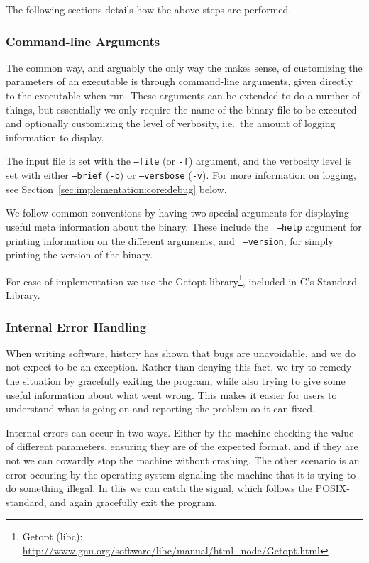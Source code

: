The following sections details how the above steps are performed.

\subsubsection{Command-line Arguments}
The common way, and arguably the only way the makes sense, of customizing the
parameters of an executable is through command-line arguments, given directly to
the executable when run. These arguments can be extended to do a number of
things, but essentially we only require the name of the binary file to be
executed and optionally customizing the level of verbosity, i.e.\ the amount of
logging information to display.

The input file is set with the {\tt --file} (or {\tt -f}) argument, and the
verbosity level is set with either {\tt --brief} ({\tt -b}) or {\tt --versbose}
({\tt -v}). For more information on logging, see
Section~\ref{sec:implementation:core:debug} below.

We follow common conventions by having two special arguments for displaying
useful meta information about the \thename{} binary. These include the {\tt
  --help} argument for printing information on the different arguments, and {\tt
  --version}, for simply printing the version of the binary.

For ease of implementation we use the Getopt library\footnote{Getopt (libc):
  \url{http://www.gnu.org/software/libc/manual/html_node/Getopt.html}}, included
in C's Standard Library.

\subsubsection{Internal Error Handling}

When writing software, history has shown that bugs are unavoidable, and we do
not expect \thename{} to be an exception. Rather than denying this fact, we try
to remedy the situation by gracefully exiting the program, while also trying to
give some useful information about what went wrong. This makes it easier for
users to understand what is going on and reporting the problem so it can fixed.

Internal errors can occur in two ways. Either by the machine checking the value
of different parameters, ensuring they are of the expected format, and if they
are not we can cowardly stop the machine without crashing. The other scenario is
an error occuring by the operating system signaling the machine that it is
trying to do something illegal. In this we can catch the signal, which follows
the POSIX-standard, and again gracefully exit the program.

